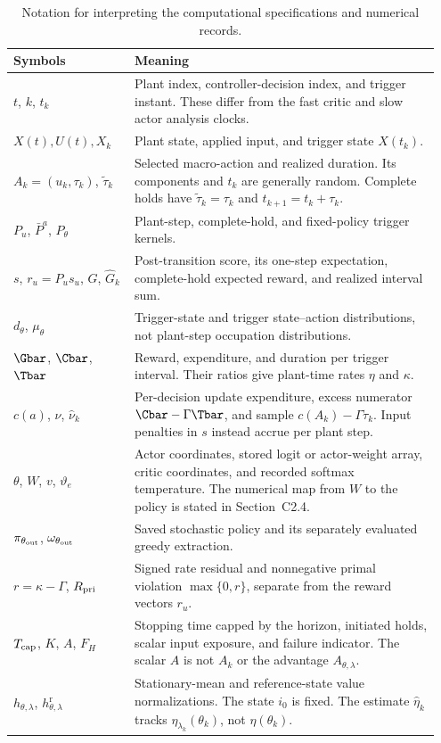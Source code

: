\begin{table}[htbp]
\caption{Notation for interpreting the computational specifications and numerical records.}
\label{comp:tab:notation_clocks}
\centering
\begingroup
\small
\renewcommand{\arraystretch}{1.12}
\begin{tabular}{@{}p{0.27\linewidth}p{0.68\linewidth}@{}}
\toprule
Symbols & Meaning \\
\midrule
$t$, $k$, $t_k$ & Plant index, controller-decision index, and trigger instant. These differ from the fast critic and slow actor analysis clocks. \\
$X(t),U(t),X_k$ & Plant state, applied input, and trigger state $X(t_k)$. \\
$A_k=(u_k,\tau_k)$, $\tilde\tau_k$ & Selected macro-action and realized duration. Its components and $t_k$ are generally random. Complete holds have $\tilde\tau_k=\tau_k$ and $t_{k+1}=t_k+\tau_k$. \\
$P_u$, $\bar P^a$, $P_\theta$ & Plant-step, complete-hold, and fixed-policy trigger kernels. \\
$s$, $r_u=P_us_u$, $G$, $\widehat G_k$ & Post-transition score, its one-step expectation, complete-hold expected reward, and realized interval sum. \\
$d_\theta$, $\mu_\theta$ & Trigger-state and trigger state--action distributions, not plant-step occupation distributions. \\
$\Gbar$, $\Cbar$, $\Tbar$ & Reward, expenditure, and duration per trigger interval. Their ratios give plant-time rates $\eta$ and $\kappa$. \\
$c(a)$, $\nu$, $\widehat\nu_k$ & Per-decision update expenditure, excess numerator $\Cbar-\Gamma\Tbar$, and sample $c(A_k)-\Gamma\tilde\tau_k$. Input penalties in $s$ instead accrue per plant step. \\
$\theta$, $W$, $v$, $\vartheta_e$ & Actor coordinates, stored logit or actor-weight array, critic coordinates, and recorded softmax temperature. The numerical map from $W$ to the policy is stated in Section~C2.4. \\
$\pi_{\theta_{\rm out}}$, $\omega_{\theta_{\rm out}}$ & Saved stochastic policy and its separately evaluated greedy extraction. \\
$r=\kappa-\Gamma$, $R_{\rm pri}$ & Signed rate residual and nonnegative primal violation $\max\{0,r\}$, separate from the reward vectors $r_u$. \\
$T_{\rm cap}$, $K$, $A$, $F_H$ & Stopping time capped by the horizon, initiated holds, scalar input exposure, and failure indicator. The scalar $A$ is not $A_k$ or the advantage $A_{\theta,\lambda}$. \\
$h_{\theta,\lambda}$, $h^{\mathrm r}_{\theta,\lambda}$ & Stationary-mean and reference-state value normalizations. The state $i_0$ is fixed. The estimate $\hat\eta_k$ tracks $\eta_{\lambda_k}(\theta_k)$, not $\eta(\theta_k)$. \\
\bottomrule
\end{tabular}
\endgroup
\end{table}
